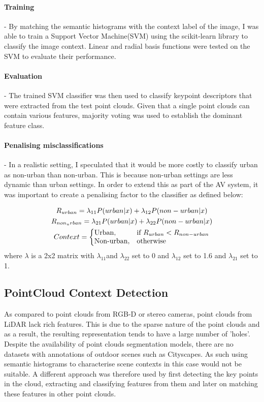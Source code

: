 \paragraph{Training} - By matching the semantic histograms with the context label of the image, I was able to train a Support Vector Machine(SVM) using the scikit-learn library to classify the image context. Linear and radial basis functions were tested on the SVM to evaluate their performance.
\paragraph{Evaluation} - The trained SVM classifier was then used to classify keypoint descriptors that were extracted from the test point clouds. Given that a single point clouds can contain various features, majority voting was used to establish the dominant feature class. 

\paragraph{Penalising misclassifications} - In a realistic setting, I speculated that it would be more costly to classify urban as non-urban than non-urban. This is because non-urban settings are less dynamic than urban settings. In order to extend this as part of the AV system, it was important to create a penalising factor to the classifier as defined below: 

\noindent


\begin{gather*}
	R_{urban} = \lambda _{11}P(urban |x) + \lambda _{12}P(non-urban|x)  \\ 
	R_{non_urban} = \lambda_{21}P(urban|x) + \lambda _{22}P(non-urban|x)\\ 
	Context=\left\{
		\begin{array}{@{}ll@{}}
		\text{Urban}, & \text{if}\ R_{urban} < R_{non-urban}  \\
		\text{Non-urban}, & \text{otherwise}
		\end{array}\right.
\end{gather*} 
where $\lambda $ is a 2x2 matrix with $\lambda_{11}$and $\lambda_{22}$ set to 0 and $\lambda_{12}$ set to 1.6 and $\lambda_{21}$ set to 1.





\subsection{PointCloud Context Detection}
As compared to point clouds from RGB-D or stereo cameras, point clouds from LiDAR lack rich features. This is due to the sparse nature of the point clouds and as a result, the resulting representation tends to have a large number of 'holes'. Despite the availability of point clouds segmentation models, there are no datasets with annotations of outdoor scenes such as Cityscapes. As such using semantic histograms to characterise scene contexts in this case would not be suitable.
A different approach was therefore used by first detecting the key points in the cloud, extracting and classifying features from them and later on matching these features in other point clouds.  

